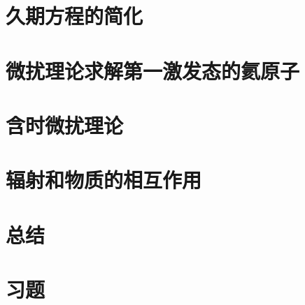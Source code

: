 \section{久期方程的简化}
\label{sec:9.6 Simplification of the Duration Equation}

\section{微扰理论求解第一激发态的氦原子}
\label{sec:9.7 Perturbation Treatment of the First Excited State of Helium}

\section{含时微扰理论}
\label{sec:9.8 Time-dependent Perturbation Theory}

\section{辐射和物质的相互作用}
\label{sec:9.9 Interaction of Radiation and Matter}

\section*{总结}

\section*{习题}